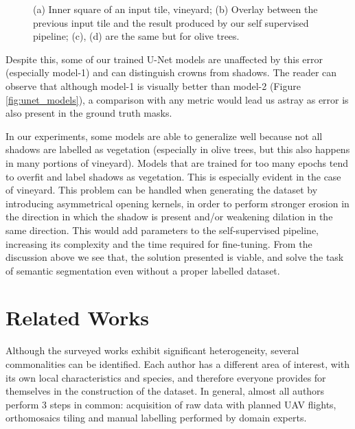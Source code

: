 \documentclass[comsoc,final]{IEEEtran}
\newcommand{\todo}[1]{\textcolor{red}{#1}}
\begin{document}
\begin{figure}
\begin{subfigure}[b]{0.47\columnwidth}
         \caption{}
         \label{maskplot:d}
     \end{subfigure}%
%        
     \caption{(a) Inner square of an input tile, vineyard; (b) Overlay between the previous input tile and the result produced by our self supervised pipeline; 
     (c), (d) are the same but for olive trees.}
     \label{fig:input_gt}%
\end{figure}

 Despite this, some of our trained U-Net models are unaffected by this error (especially model-1) and can distinguish crowns from shadows. The reader can observe that although model-1 is visually better than model-2 (Figure \ref{fig:unet_models}), a comparison with any metric would lead us astray as error is also present in the ground truth masks.

In our experiments, some models are able to generalize well because not all shadows are labelled as vegetation (especially in olive trees, but this also happens in many portions of vineyard). Models that are trained for too many epochs tend to overfit and label shadows as vegetation. This is especially evident in the case of vineyard.
This problem can be handled when generating the dataset by introducing asymmetrical opening kernels, in order to perform stronger erosion in the direction in which the shadow is present and/or weakening dilation in the same direction. This would add parameters to the self-supervised pipeline, increasing its complexity and the time required for fine-tuning. From the discussion above we see that, the solution presented is viable, and solve the task of semantic segmentation even without a proper labelled dataset.



\section{Related Works}\label{sec:related}

Although the surveyed works exhibit significant heterogeneity, several commonalities can be identified. Each author has a different area of interest, with its own local characteristics and species, and therefore everyone provides for themselves in the construction of the dataset. In general, almost all authors perform 3 steps in common: acquisition of raw data with planned UAV flights, orthomosaics tiling and manual labelling performed by domain experts.
\end{document}
